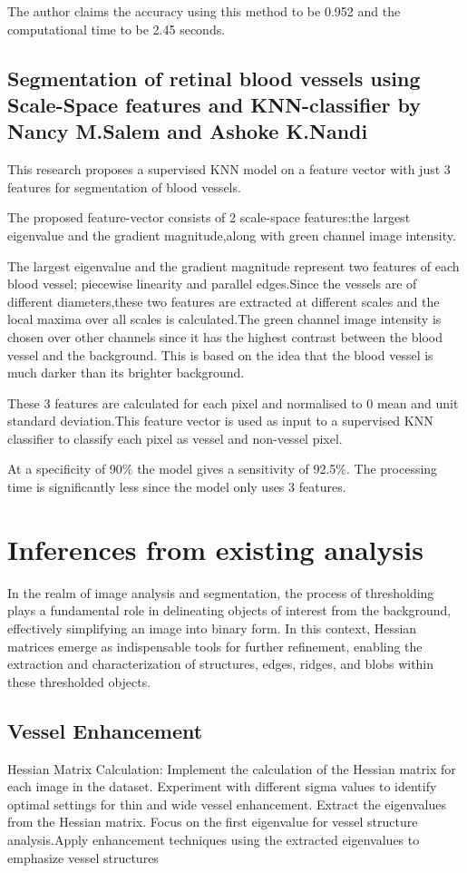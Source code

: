 \documentclass{article}
\begin{document}
The author claims the accuracy using this method to be 0.952 and the computational time to be 2.45 seconds.

\subsection{Segmentation of retinal blood vessels using Scale-Space features and KNN-classifier by Nancy M.Salem and Ashoke K.Nandi}
This research proposes a supervised KNN model on a feature vector with just 3 features for segmentation of blood vessels.

The proposed feature-vector consists of 2 scale-space features:the largest eigenvalue and the gradient magnitude,along with green channel image intensity.

The largest eigenvalue and the gradient magnitude represent two features of each blood vessel; piecewise linearity and parallel edges.Since the vessels are of different diameters,these two features are extracted at different scales and the local maxima over all scales is calculated.The green channel image intensity is chosen over other channels since it has the highest contrast between the blood vessel and the background. This is based on the idea that the blood vessel is much darker than its brighter background.

These 3 features are calculated for each pixel and normalised to 0 mean and unit standard deviation.This feature vector is used as input to a supervised KNN classifier to classify each pixel as vessel and non-vessel pixel.

At a specificity of 90\% the model gives a sensitivity of 92.5\%.
The processing time is significantly less since the model only uses 3 features.

\section{Inferences from existing analysis}

In the realm of image analysis and segmentation, the process of thresholding plays a fundamental role in delineating objects of interest from the background, effectively simplifying an image into binary form. In this context, Hessian matrices emerge as indispensable tools for further refinement, enabling the extraction and characterization of structures, edges, ridges, and blobs within these thresholded objects.

\subsection{Vessel Enhancement}
Hessian Matrix Calculation: Implement the calculation of the Hessian matrix for each image in the dataset. Experiment with different sigma values to identify optimal settings for thin and wide vessel enhancement.
Extract the eigenvalues from the Hessian matrix. Focus on the first eigenvalue for vessel structure analysis.Apply enhancement techniques using the extracted eigenvalues to emphasize vessel structures
\end{document}
